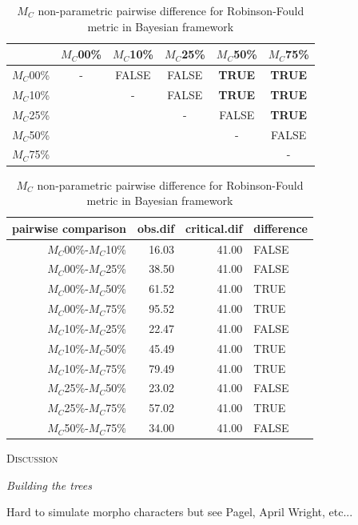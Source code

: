 \documentclass[12pt,letterpaper]{article}
\renewcommand{\section}[1]{%
\bigskip
\begin{center}
\begin{Large}
\normalfont\scshape #1
\medskip
\end{Large}
\end{center}}
\renewcommand{\subsection}[1]{%
\bigskip
\begin{center}
\begin{large}
\normalfont\itshape #1
\end{large}
\end{center}}
\begin{document}
\begin{table}
\caption{$M_C$ non-parametric pairwise difference for Robinson-Fould metric in Bayesian framework}
\centering
\begin{tabular}{c|ccccc}
    \hline
              & $M_C$00\% & $M_C$10\% & $M_C$25\% & $M_C$50\% & $M_C$75\% \\
    \hline
    $M_C$00\% & - & FALSE & FALSE & \textbf{TRUE} & \textbf{TRUE}\\
    $M_C$10\% & & - & FALSE & \textbf{TRUE} & \textbf{TRUE} \\
    $M_C$25\% & & & - & FALSE & \textbf{TRUE} \\
    $M_C$50\% & & & & - & FALSE \\
    $M_C$75\% & & & & & - \\
    \hline
\end{tabular}
\centering
\begin{tabular}{rrrl}
 pairwise comparison & obs.dif & critical.dif & difference \\ 
  \hline
  $M_C$00\%-$M_C$10\% & 16.03 & 41.00 & FALSE \\ 
  $M_C$00\%-$M_C$25\% & 38.50 & 41.00 & FALSE \\ 
  $M_C$00\%-$M_C$50\% & 61.52 & 41.00 & TRUE \\ 
  $M_C$00\%-$M_C$75\% & 95.52 & 41.00 & TRUE \\ 
  $M_C$10\%-$M_C$25\% & 22.47 & 41.00 & FALSE \\ 
  $M_C$10\%-$M_C$50\% & 45.49 & 41.00 & TRUE \\ 
  $M_C$10\%-$M_C$75\% & 79.49 & 41.00 & TRUE \\ 
  $M_C$25\%-$M_C$50\% & 23.02 & 41.00 & FALSE \\ 
  $M_C$25\%-$M_C$75\% & 57.02 & 41.00 & TRUE \\ 
  $M_C$50\%-$M_C$75\% & 34.00 & 41.00 & FALSE \\ 
   \hline
\end{tabular}
\label{Ba_RF-MC_results}
\end{table}

%
%


\section{Discussion}

\subsection{Building the trees}
Hard to simulate morpho characters but see Pagel, April Wright, etc...
\end{document}
